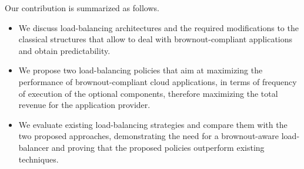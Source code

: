 Our contribution is summarized as follows.
\begin{itemize}
\item We discuss load-balancing architectures and the required
  modifications to the classical structures that allow to deal with
  brownout-compliant applications and obtain predictability.
\item We propose two load-balancing policies that aim at maximizing
  the performance of brownout-compliant cloud applications, in terms
  of frequency of execution of the optional components, therefore
  maximizing the total revenue for the application provider.
\item We evaluate existing load-balancing strategies and compare them
  with the two proposed approaches, demonstrating the need for a
  brownout-aware load-balancer and proving that the proposed policies
  outperform existing techniques.
\end{itemize}
